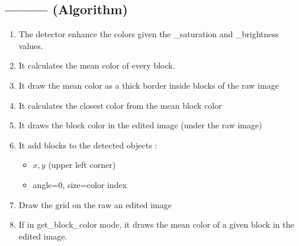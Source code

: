 \subsection{--------- (Algorithm)}
    \begin{enumerate}
        \item The detector enhance the colors given the \_saturation and 
                \_brightness values.
        \item It calculates the mean color of every block.
        \item It draw the mean color as a thick border inside blocks of 
            the raw image
        \item It calculates the closest color from the mean block color
        \item It draws the block color in the edited image (under the raw 
            image)
        \item It add blocks to the detected objects :
        \begin{itemize}
            \item $x,y$ (upper left corner)
            \item angle=0, size=color index
        \end{itemize}
        \item Draw the grid on the raw an edited image
        \item If in get\_block\_color mode, it draws the mean color of a 
            given block in the edited image.
    \end{enumerate}




